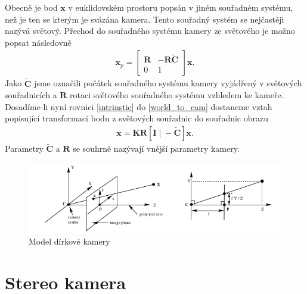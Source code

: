 \documentclass[twoside]{ctuthesis}
\newcommand{\tl}[1]{$\mathbf{#1}$}
\begin{document}
Obecně je bod $\mathbf{x}$ v euklidovském prostoru popsán v jiném souřadném systému, než je ten se kterým je svázána kamera. Tento souřadný systém se nejčastěji nazývá světový. Přechod do souřadného systému kamery ze světového je možno popsat následovně 
\begin{align} 
    \mathbf{x}_p = \begin{bmatrix} \mathbf{R} & -\mathbf{R\tilde C} \\ 0 & 1 \end{bmatrix}
    \mathbf{x}.
    \label{world_to_cam}
\end{align}
Jako $\tilde{\mathbf{C}}$ jsme označili počátek souřadného systému kamery vyjádřený v světových souřadnicích a \tl{R} rotaci světového souřadného systému vzhledem ke kameře. Dosadíme-li nyní rovnici \ref{intrinstic} do \ref{world_to_cam} dostaneme vztah popisující transformaci bodu z světových souřadnic do souřadnic obrazu
\begin{align}
    \mathbf{x} = \mathbf{KR}[\mathbf{I} \; | \; - \mathbf{\tilde C} ]\mathbf{x}.
    \label{world_to_img}
\end{align}
Parametry $\mathbf{\tilde C}$ a \tl{R} se souhrně nazývají vnější parametry kamery. 
\begin{figure}
    \centering
    \includegraphics[width = 0.8\linewidth]{pictures/dirkovymodel_nakres.png}
    \caption{Model dírkové kamery}
    \label{pinhole}
\end{figure}

\section{Stereo kamera}
\end{document}
